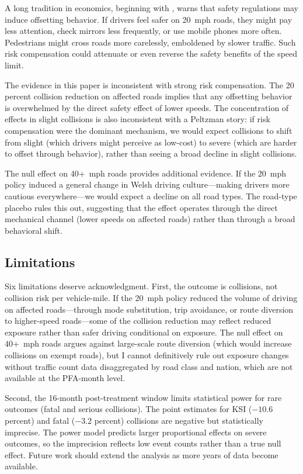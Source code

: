 \documentclass[12pt]{article}
\begin{document}
A long tradition in economics, beginning with \citet{peltzman1975}, warns that safety regulations may induce offsetting behavior. If drivers feel safer on 20~mph roads, they might pay less attention, check mirrors less frequently, or use mobile phones more often. Pedestrians might cross roads more carelessly, emboldened by slower traffic. Such risk compensation could attenuate or even reverse the safety benefits of the speed limit.

The evidence in this paper is inconsistent with strong risk compensation. The 20 percent collision reduction on affected roads implies that any offsetting behavior is overwhelmed by the direct safety effect of lower speeds. The concentration of effects in slight collisions is also inconsistent with a Peltzman story: if risk compensation were the dominant mechanism, we would expect collisions to shift from slight (which drivers might perceive as low-cost) to severe (which are harder to offset through behavior), rather than seeing a broad decline in slight collisions.

The null effect on 40+~mph roads provides additional evidence. If the 20~mph policy induced a general change in Welsh driving culture---making drivers more cautious everywhere---we would expect a decline on all road types. The road-type placebo rules this out, suggesting that the effect operates through the direct mechanical channel (lower speeds on affected roads) rather than through a broad behavioral shift.

\subsection{Limitations}

Six limitations deserve acknowledgment. First, the outcome is collisions, not collision risk per vehicle-mile. If the 20~mph policy reduced the volume of driving on affected roads---through mode substitution, trip avoidance, or route diversion to higher-speed roads---some of the collision reduction may reflect reduced exposure rather than safer driving conditional on exposure. The null effect on 40+~mph roads argues against large-scale route diversion (which would increase collisions on exempt roads), but I cannot definitively rule out exposure changes without traffic count data disaggregated by road class and nation, which are not available at the PFA-month level.

Second, the 16-month post-treatment window limits statistical power for rare outcomes (fatal and serious collisions). The point estimates for KSI ($-10.6$ percent) and fatal ($-3.2$ percent) collisions are negative but statistically imprecise. The power model predicts larger proportional effects on severe outcomes, so the imprecision reflects low event counts rather than a true null effect. Future work should extend the analysis as more years of data become available.
\end{document}
